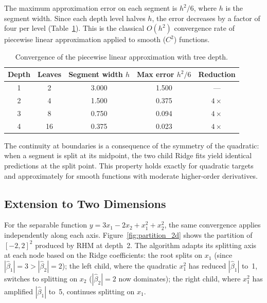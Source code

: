 \documentclass[11pt,a4paper]{article}
\begin{document}
The maximum approximation error on each segment is $h^2/6$, where $h$ is the segment width. Since each depth level halves $h$, the error decreases by a factor of four per level (Table~\ref{tab:convergence}). This is the classical $O(h^2)$ convergence rate of piecewise linear approximation applied to smooth ($C^2$) functions.

\begin{table}[ht]
\centering
\caption{Convergence of the piecewise linear approximation with tree depth.}\label{tab:convergence}
\begin{tabular}{ccccc}
\toprule
\textbf{Depth} & \textbf{Leaves} & \textbf{Segment width $h$} & \textbf{Max error $h^2/6$} & \textbf{Reduction} \\
\midrule
1 & 2  & 3.000 & 1.500 & --- \\
2 & 4  & 1.500 & 0.375 & $4\times$ \\
3 & 8  & 0.750 & 0.094 & $4\times$ \\
4 & 16 & 0.375 & 0.023 & $4\times$ \\
\bottomrule
\end{tabular}
\end{table}

The continuity at boundaries is a consequence of the symmetry of the quadratic: when a segment is split at its midpoint, the two child Ridge fits yield identical predictions at the split point. This property holds exactly for quadratic targets and approximately for smooth functions with moderate higher-order derivatives.

\subsection{Extension to Two Dimensions}

For the separable function $y = 3x_1 - 2x_2 + x_1^2 + x_2^2$, the same convergence applies independently along each axis. Figure~\ref{fig:partition_2d} shows the partition of $[-2,2]^2$ produced by RHM at depth~2. The algorithm adapts its splitting axis at each node based on the Ridge coefficients: the root splits on $x_1$ (since $|\hat{\beta}_1| = 3 > |\hat{\beta}_2| = 2$); the left child, where the quadratic $x_1^2$ has reduced $|\hat{\beta}_1|$ to~1, switches to splitting on $x_2$ ($|\hat{\beta}_2| = 2$ now dominates); the right child, where $x_1^2$ has amplified $|\hat{\beta}_1|$ to~5, continues splitting on $x_1$.
\end{document}
